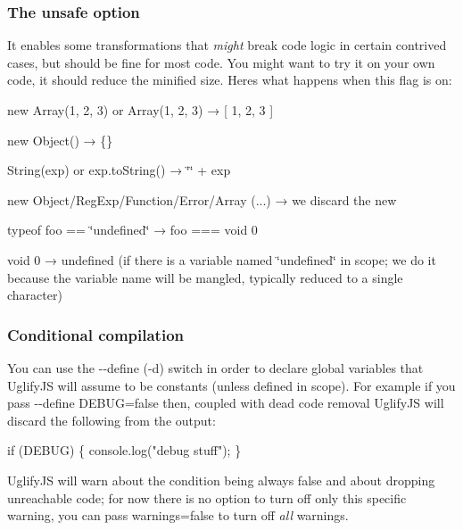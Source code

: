 \subsubsection*{The {\ttfamily unsafe} option}

It enables some transformations that {\itshape might} break code logic in certain contrived cases, but should be fine for most code. You might want to try it on your own code, it should reduce the minified size. Here\textquotesingle{}s what happens when this flag is on\+:


\begin{DoxyItemize}
\item {\ttfamily new Array(1, 2, 3)} or {\ttfamily Array(1, 2, 3)} → {\ttfamily \mbox{[} 1, 2, 3 \mbox{]}}
\item {\ttfamily new Object()} → {\ttfamily \{\}}
\item {\ttfamily String(exp)} or {\ttfamily exp.\+to\+String()} → {\ttfamily \char`\"{}\char`\"{} + exp}
\item {\ttfamily new Object/\+Reg\+Exp/\+Function/\+Error/\+Array (...)} → we discard the {\ttfamily new}
\item {\ttfamily typeof foo == \char`\"{}undefined\char`\"{}} → {\ttfamily foo === void 0}
\item {\ttfamily void 0} → {\ttfamily undefined} (if there is a variable named \char`\"{}undefined\char`\"{} in scope; we do it because the variable name will be mangled, typically reduced to a single character)
\end{DoxyItemize}

\subsubsection*{Conditional compilation}

You can use the {\ttfamily -\/-\/define} ({\ttfamily -\/d}) switch in order to declare global variables that Uglify\+JS will assume to be constants (unless defined in scope). For example if you pass {\ttfamily -\/-\/define D\+E\+B\+UG=false} then, coupled with dead code removal Uglify\+JS will discard the following from the output\+: 
\begin{DoxyCode}
if (DEBUG) \{
    console.log("debug stuff");
\}
\end{DoxyCode}


Uglify\+JS will warn about the condition being always false and about dropping unreachable code; for now there is no option to turn off only this specific warning, you can pass {\ttfamily warnings=false} to turn off {\itshape all} warnings.


